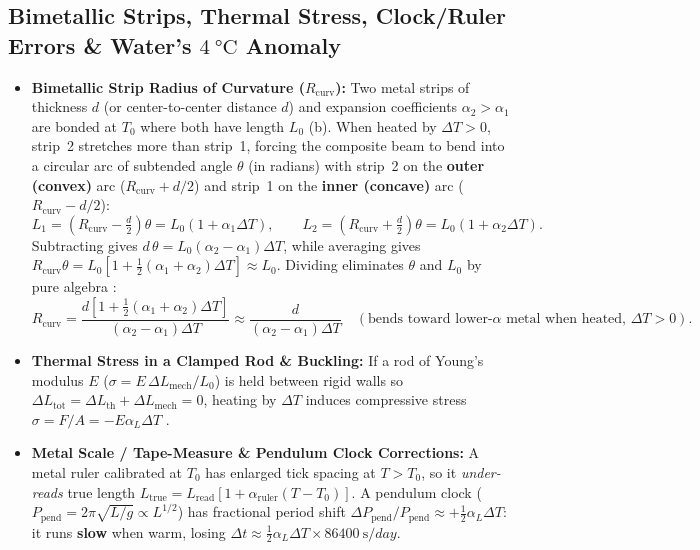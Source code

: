 \subsection{Bimetallic Strips, Thermal Stress, Clock/Ruler Errors \& Water's $\SI{4}{\celsius}$ Anomaly}
\begin{itemize}
  \item \textbf{Bimetallic Strip Radius of Curvature ($R_{\mathrm{curv}}$):} Two metal strips of thickness $d$ (or center-to-center distance $d$) and expansion coefficients $\alpha_2 > \alpha_1$ are bonded at $T_0$ where both have length $L_0$ (b). When heated by $\Delta T > 0$, strip~2 stretches more than strip~1, forcing the composite beam to bend into a circular arc of subtended angle $\theta$ (in radians) with strip~2 on the \textbf{outer (convex)} arc ($R_{\mathrm{curv}} + d/2$) and strip~1 on the \textbf{inner (concave)} arc ($R_{\mathrm{curv}} - d/2$):
    \[
      L_1 = \left(R_{\mathrm{curv}} - \tfrac{d}{2}\right)\theta = L_0(1 + \alpha_1\Delta T), \qquad
      L_2 = \left(R_{\mathrm{curv}} + \tfrac{d}{2}\right)\theta = L_0(1 + \alpha_2\Delta T).
    \]
    Subtracting gives $d\,\theta = L_0(\alpha_2 - \alpha_1)\Delta T$, while averaging gives $R_{\mathrm{curv}}\theta = L_0\left[1 + \tfrac{1}{2}(\alpha_1+\alpha_2)\Delta T\right] \approx L_0$. Dividing eliminates $\theta$ and $L_0$ by pure algebra :
    \begin{equation}\label{eq:03:bimetallic}
      \boxed{R_{\mathrm{curv}} = \frac{d\left[1 + \frac{1}{2}(\alpha_1 + \alpha_2)\Delta T\right]}{(\alpha_2 - \alpha_1)\Delta T} \approx \frac{d}{(\alpha_2 - \alpha_1)\Delta T}} \quad (\text{bends toward lower-}\alpha\text{ metal when heated, }\Delta T > 0).
    \end{equation}
  \item \textbf{Thermal Stress in a Clamped Rod \& Buckling:} If a rod of Young's modulus $E$ ($\sigma = E\,\Delta L_{\mathrm{mech}}/L_0$) is held between rigid walls so $\Delta L_{\mathrm{tot}} = \Delta L_{\mathrm{th}} + \Delta L_{\mathrm{mech}} = 0$, heating by $\Delta T$ induces compressive stress $\sigma = F/A = -E\alpha_L\Delta T$ .
  \item \textbf{Metal Scale / Tape-Measure \& Pendulum Clock Corrections:} A metal ruler calibrated at $T_0$ has enlarged tick spacing at $T > T_0$, so it \emph{under-reads} true length $L_{\mathrm{true}} = L_{\mathrm{read}}\left[1 + \alpha_{\mathrm{ruler}}(T - T_0)\right]$. A pendulum clock ($P_{\mathrm{pend}} = 2\pi\sqrt{L/g} \propto L^{1/2}$) has fractional period shift $\Delta P_{\mathrm{pend}}/P_{\mathrm{pend}} \approx +\tfrac{1}{2}\alpha_L\Delta T$: it runs \textbf{slow} when warm, losing $\Delta t \approx \tfrac{1}{2}\alpha_L\Delta T \times \SI{86400}{\second/day}$.

\end{itemize}
